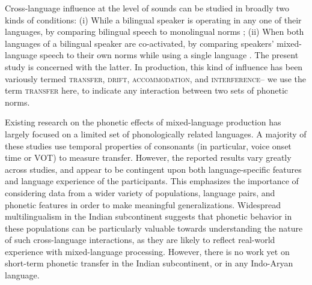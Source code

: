 \documentclass[12 pt]{article}
\begin{document}
Cross-language influence at the level of sounds can be studied in broadly two kinds of conditions:
(i) While a bilingual speaker is operating in any one of their languages, by comparing bilingual speech to monolingual norms \citep[e.g.][]{guion2003vowel,caramazza1973acquisition,flege1987production}; %
(ii) When both languages of a bilingual speaker are co-activated, by comparing speakers' mixed-language speech to their own norms while using a single language \citep[e.g.][]{grosjean1994going, bullock2009trying,elias2017effects, simonet2014phonetic}. %
The present study is concerned with the latter. In production, this kind of influence has been variously termed \textsc{transfer, drift, accommodation,} and \textsc{interference}-- we use the term \textsc{transfer} here, to indicate any interaction between two sets of phonetic norms.

Existing research on the phonetic effects of mixed-language production has largely focused on a limited set of phonologically related languages. A majority of these studies use temporal properties of consonants (in particular, voice onset time or VOT) to measure transfer. However, the reported results vary greatly across studies, and appear to be contingent upon both language-specific features and language experience of the participants. This emphasizes the importance of considering data from a wider variety of
populations, language pairs,  and phonetic features in order to make meaningful generalizations. Widespread multilingualism in the Indian subcontinent suggests that phonetic
behavior in these populations can be particularly valuable towards understanding the nature of such cross-language interactions, as they are likely to reflect real-world experience with mixed-language processing. However, there is no work yet on short-term phonetic transfer in the Indian subcontinent, or in any Indo-Aryan language. 
\end{document}
